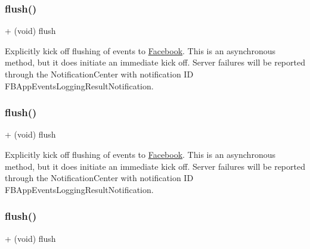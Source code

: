 \subsubsection{\texorpdfstring{flush()}{flush()}\hspace{0.1cm}{\footnotesize\ttfamily [2/5]}}
{\footnotesize\ttfamily + (void) flush \begin{DoxyParamCaption}{ }\end{DoxyParamCaption}}

Explicitly kick off flushing of events to \hyperlink{interfaceFacebook}{Facebook}. This is an asynchronous method, but it does initiate an immediate kick off. Server failures will be reported through the Notification\+Center with notification ID {\ttfamily F\+B\+App\+Events\+Logging\+Result\+Notification}. \mbox{\label{interfaceFBAppEvents_a0475c0b929152f9be2b7428312382747}} 
\subsubsection{\texorpdfstring{flush()}{flush()}\hspace{0.1cm}{\footnotesize\ttfamily [3/5]}}
{\footnotesize\ttfamily + (void) flush \begin{DoxyParamCaption}{ }\end{DoxyParamCaption}}

Explicitly kick off flushing of events to \hyperlink{interfaceFacebook}{Facebook}. This is an asynchronous method, but it does initiate an immediate kick off. Server failures will be reported through the Notification\+Center with notification ID {\ttfamily F\+B\+App\+Events\+Logging\+Result\+Notification}. \mbox{\label{interfaceFBAppEvents_a0475c0b929152f9be2b7428312382747}} 
\subsubsection{\texorpdfstring{flush()}{flush()}\hspace{0.1cm}{\footnotesize\ttfamily [4/5]}}
{\footnotesize\ttfamily + (void) flush \begin{DoxyParamCaption}{ }\end{DoxyParamCaption}}

